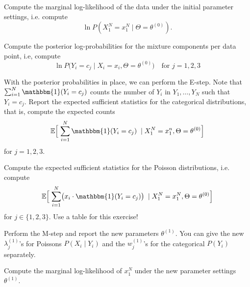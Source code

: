 \documentclass[a4paper,10pt,landscape,twocolumn]{scrartcl}
\newcommand{\Ind}[1]{\mathbbm{1}(#1)}
\begin{document}
\begin{exercise}
	
	
	\begin{subex}
		Compute the marginal log-likelihood of the data under the initial parameter settings, i.e. compute 
		\[
		\ln P(X_1^N = x_1^N \mid \Theta = \theta^{(0)}).
		\]
	\end{subex}
	
	\begin{subex}
		Compute the posterior log-probabilities for the mixture components per data point, i.e, compute
		\[
			\ln P\bigl(Y_i = c_j \mid X_i = x_i, \Theta = \theta^{(0)}\bigr) \quad \text{for $j=1,2,3$}
		\]
	\end{subex}
	
	\begin{subex}
		With the posterior probabilities in place, we can perform the E-step. Note that $\sum_{i=1}^N \Ind{Y_i = c_j}$ counts the number of $Y_i$ in $Y_1, \dots, Y_N$ such that $Y_i = c_j$. Report the expected sufficient statistics for the categorical distributions, that is, compute the expected counts
		\[
			\mathbb E\Bigl[ \; \sum_{i=1}^N \Ind{Y_i = c_j} \; \mid X_1^N = x_1^n, \Theta = \theta^{(0)} \Bigr]
		\]
		for $j = 1, 2, 3$.
	\end{subex}

	\begin{subex}
	Compute the expected sufficient statistics for the Poisson distributions, i.e. compute 
	\[
		\mathbb E\Bigl[\;\sum_{i=1}^N \bigl(x_i \cdot \Ind{Y_i = c_j}\bigr) \;\mid X_1^N = x_1^N, \Theta=\theta^{(0)}\Bigr]
	\] for  $j\in \{1, 2, 3\}$. Use a table for this exercise!
	\end{subex}
	
	\begin{subex}
	Perform the M-step and report the new parameters $\theta^{(1)}$. You can give the new $\lambda_j^{(1)}$'s for Poissons $P(X_i \mid Y_i)$ and the $w_j^{(1)}$'s for the categorical $ P(Y_i) $ separately.
	\end{subex}
	
	\begin{subex}
		Compute the marginal log-likelihood of $ x_1^N $ under the new parameter settings $\theta^{(1)}$. 
	\end{subex}


\end{exercise}
\end{document}
